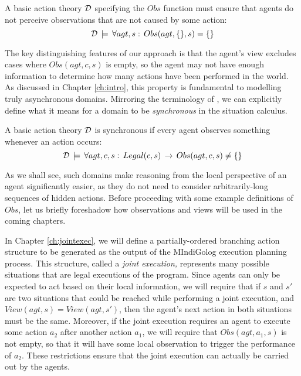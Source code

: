 \begin{defnL}
 A basic action theory
$\mathcal{D}$ specifying the $Obs$ function must ensure that agents do not
perceive observations that are not caused by some action:\[
\mathcal{D}\,\models\,\forall agt,s:\, Obs(agt,\{\},s)=\{\}\]

\end{defnL}
The key distinguishing features of our approach is that the agent's
view excludes cases where $Obs(agt,c,s)$ is empty, so the agent may
not have enough information to determine how many actions have been
performed in the world. As discussed in Chapter \ref{ch:intro}, this
property is fundamental to modelling truly asynchronous domains. Mirroring
the terminology of \citep{vanBentham06tree_of_knowledge}, we can
explicitly define what it means for a domain to be \emph{synchronous}
in the situation calculus.

\begin{defnL}
 A basic action theory $\mathcal{D}$
is synchronous if every agent observes something whenever an action
occurs:\label{def:Synchronous-Action-Theory}\[
\mathcal{D}\,\models\,\forall agt,c,s:\, Legal(c,s)\,\rightarrow\, Obs(agt,c,s)\neq\{\}\]

\end{defnL}
As we shall see, such domains make reasoning from the local perspective
of an agent significantly easier, as they do not need to consider
arbitrarily-long sequences of hidden actions. Before proceeding with
some example definitions of $Obs$, let us briefly foreshadow how
observations and views will be used in the coming chapters.

In Chapter \ref{ch:jointexec}, we will define a partially-ordered
branching action structure to be generated as the output of the MIndiGolog
execution planning process. This structure, called a \emph{joint execution,}
represents many possible situations that are legal executions of the
program. Since agents can only be expected to act based on their local
information, we will require that if $s$ and $s'$ are two situations
that could be reached while performing a joint execution, and $View(agt,s)=View(agt,s')$,
then the agent's next action in both situations must be the same.
Moreover, if the joint execution requires an agent to execute some
action $a_{2}$ after another action $a_{1}$, we will require that
$Obs(agt,a_{1},s)$ is not empty, so that it will have some local
observation to trigger the performance of $a_{2}$. These restrictions
ensure that the joint execution can actually be carried out by the
agents.

